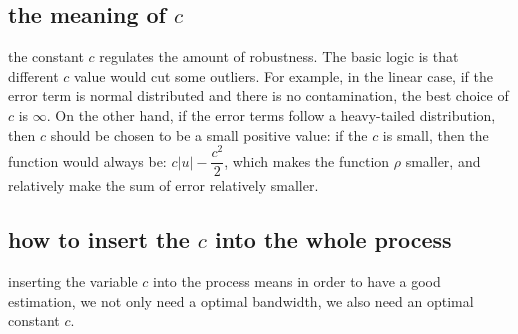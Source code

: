 \documentclass[12pt]{amsart}
\begin{document}
\subsection{the meaning of $c$}
the constant $c$ regulates the amount of robustness. The basic logic is that different $c$ value would cut some outliers. For example, in the linear case, if the error term is normal distributed and there is no contamination, the best choice of $c$ is $\infty$. On the other hand, if the error terms follow a heavy-tailed distribution, then $c$ should be chosen to be a small positive value: if the $c$ is small, then the function would always be: $c|u|-\dfrac{c^2}{2}$, which makes the function $\rho$ smaller, and relatively make the sum of error relatively smaller.
\subsection{how to insert the $c$ into the whole process}
inserting the variable $c$ into the process means in order to have a good estimation, we not only need a optimal bandwidth, we also need an optimal constant $c$.
\end{document}
